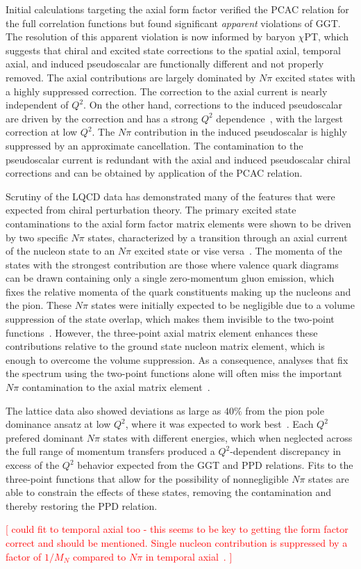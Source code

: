 Initial calculations targeting the axial form factor verified the PCAC relation
 for the full correlation functions but found significant \emph{apparent} violations
 of GGT. The resolution of this apparent violation
 is now informed by baryon $\chi$PT, which suggests that chiral
 and excited state corrections to the spatial axial, temporal axial, and induced pseudoscalar
 are functionally different and not properly removed.
The axial contributions are largely dominated by  $N\pi$ excited states
 with a highly suppressed  correction.
The correction to the axial current is nearly independent of $Q^2$.
On the other hand, corrections to the induced pseudoscalar are
 driven by the  correction and has
 a strong $Q^2$ dependence~\cite{Bar:2018xyi}, with the largest correction at low $Q^2$.
The $N\pi$  contribution in the induced pseudoscalar is highly suppressed by
 an approximate cancellation.
The contamination to the pseudoscalar current is redundant with the
 axial and induced pseudoscalar chiral corrections and can be obtained
 by application of the PCAC relation.

Scrutiny of the LQCD data has demonstrated many of the features
 that were expected from chiral perturbation theory.
The primary excited state contaminations to the axial form factor matrix elements
 were shown to be driven by two specific $N\pi$ states,
 characterized by a transition through an axial current
 of the nucleon state to an $N\pi$ excited state or vise versa~\cite{Jang:2019vkm}.
The momenta of the states with the strongest contribution are those
 where valence quark diagrams can be drawn containing only a single
 zero-momentum gluon emission, which fixes the relative momenta of the
 quark constituents making up the nucleons and the pion.
These $N\pi$ states were initially expected to be negligible due to a volume suppression
 of the state overlap, which makes them invisible to the two-point functions~\cite{Bar:2016uoj}.
However, the three-point axial matrix element enhances these contributions relative
 to the ground state nucleon matrix element, which is enough to overcome the volume suppression.
As a consequence, analyses that fix the spectrum using the two-point functions alone
 will often miss the important $N\pi$ contamination to the
 axial matrix element~\cite{Jang:2019vkm,He:2021yvm}.

The lattice data also showed deviations as large as $40\%$ from the pion pole
 dominance ansatz at low $Q^2$, where it was expected to
 work best~\cite{Bali:2014nma,Gupta:2017dwj}.
Each $Q^2$ prefered dominant $N\pi$ states with different energies,
 which when neglected across the full range of momentum transfers
 produced a $Q^2$-dependent discrepancy in excess of the $Q^2$ behavior
 expected from the GGT and PPD relations.
Fits to the three-point functions that allow for the possibility of
 nonnegligible $N\pi$ states are able to constrain the effects of these states,
 removing the contamination and thereby restoring the PPD relation.

\textcolor{red}{[ could fit to temporal axial too
 - this seems to be key to getting the form factor correct and should be mentioned.
 Single nucleon contribution is suppressed by a factor of $1/M_N$ compared to $N\pi$
  in temporal axial~\cite{Bar:2018xyi}.
 ]}

